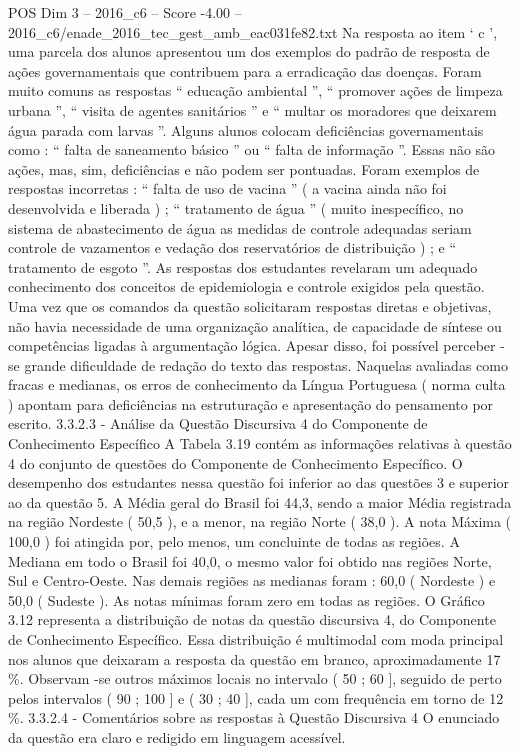 \begin{textsample}{POS Dim 3 – 2016\_c6 – Score -4.00 – 2016\_c6/enade\_2016\_tec\_gest\_amb\_eac031fe82.txt}
Na resposta ao item ‘ c ’, uma parcela dos alunos apresentou um dos exemplos do padrão de resposta de ações governamentais que contribuem para a erradicação das doenças.
Foram muito comuns as respostas “ educação ambiental ”, “ promover ações de limpeza urbana ”, “ visita de agentes sanitários ” e “ multar os moradores que deixarem água parada com larvas ”.
Alguns alunos colocam deficiências governamentais como : “ falta de saneamento básico ” ou “ falta de informação ”.
Essas não são ações, mas, sim, deficiências e não podem ser pontuadas.
Foram exemplos de respostas incorretas : “ falta de uso de vacina ” ( a vacina ainda não foi desenvolvida e liberada ) ; “ tratamento de água ” ( muito inespecífico, no sistema de abastecimento de água as medidas de controle adequadas seriam controle de vazamentos e vedação dos reservatórios de distribuição ) ; e “ tratamento de esgoto ”.
As respostas dos estudantes revelaram um adequado conhecimento dos conceitos de epidemiologia e controle exigidos pela questão.
Uma vez que os comandos da questão solicitaram respostas diretas e objetivas, não havia necessidade de uma organização analítica, de capacidade de síntese ou competências ligadas à argumentação lógica.
Apesar disso, foi possível perceber -se grande dificuldade de redação do texto das respostas.
Naquelas avaliadas como fracas e medianas, os erros de conhecimento da Língua Portuguesa ( norma culta ) apontam para deficiências na estruturação e apresentação do pensamento por escrito. 3.3.2.3 - Análise da Questão Discursiva 4 do Componente de Conhecimento Específico A Tabela 3.19 contém as informações relativas à questão 4 do conjunto de questões do Componente de Conhecimento Específico.
O desempenho dos estudantes nessa questão foi inferior ao das questões 3 e superior ao da questão 5.
A Média geral do Brasil foi 44,3, sendo a maior Média registrada na região Nordeste ( 50,5 ), e a menor, na região Norte ( 38,0 ).
A nota Máxima ( 100,0 ) foi atingida por, pelo menos, um concluinte de todas as regiões.
A Mediana em todo o Brasil foi 40,0, o mesmo valor foi obtido nas regiões Norte, Sul e Centro-Oeste.
Nas demais regiões as medianas foram : 60,0 ( Nordeste ) e 50,0 ( Sudeste ).
As notas mínimas foram zero em todas as regiões.
O Gráfico 3.12 representa a distribuição de notas da questão discursiva 4, do Componente de Conhecimento Específico.
Essa distribuição é multimodal com moda principal nos alunos que deixaram a resposta da questão em branco, aproximadamente 17 \%.
Observam -se outros máximos locais no intervalo ( 50 ; 60 ], seguido de perto pelos intervalos ( 90 ; 100 ] e ( 30 ; 40 ], cada um com frequência em torno de 12 \%. 3.3.2.4 - Comentários sobre as respostas à Questão Discursiva 4 O enunciado da questão era claro e redigido em linguagem acessível.

\end{textsample}
